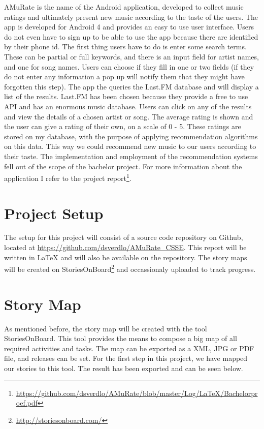 \documentclass[12pt,portrait]{article}
\begin{document}
AMuRate is the name of the Android application, developed to collect music ratings and ultimately present new music according to the taste of the users. The app is developed for Android 4 and provides an easy to use user interface. Users do not even have to sign up to be able to use the app because there are identified by their phone id. The first thing users have to do is enter some search terms. These can be partial or full keywords, and there is an input field for artist names, and one for song names. Users can choose if they fill in one or two fields (if they do not enter any information a pop up will notify them that they might have forgotten this step). The app the queries the Last.FM database and will display a list of the results. Last.FM has been chosen because they provide a free to use API and has an enormous music database. Users can click on any of the results and view the details of a chosen artist or song. The average rating is shown and the user can give a rating of their own, on a scale of 0 - 5. These ratings are stored on my database, with the purpose of applying recommendation algorithms on this data. This way we could recommend new music to our users according to their taste. The implementation and employment of the recommendation systems fell out of the scope of the bachelor project. For more information about the application I refer to the project report\footnote{\url{https://github.com/dsverdlo/AMuRate/blob/master/Log/LaTeX/Bachelorproef.pdf}}.

\section{Project Setup}

The setup for this project will consist of a source code repository on Github, located at \url{https://github.com/dsverdlo/AMuRate_CSSE}. This report will be written in LaTeX and will also be available on the repository. The story maps will be created on StoriesOnBoard\footnote{\url{http://storiesonboard.com/}} and occassionaly uploaded to track progress. 

\section{Story Map}

As mentioned before, the story map will be created with the tool StoriesOnBoard. This tool provides the means to compose a big map of all required activities and tasks. The map can be exported as a XML, JPG or PDF file, and releases can be set. For the first step in this project, we have mapped our stories to this tool. The result has been exported and can be seen below.
\end{document}
